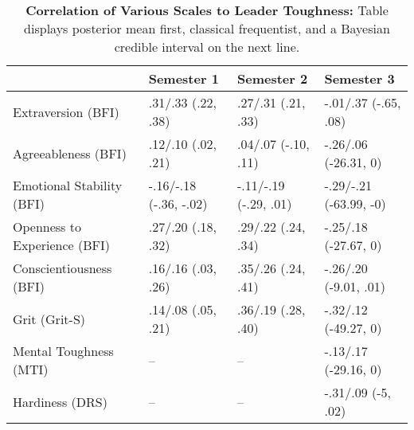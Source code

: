 \begin{table}[ht]
\centering
\begin{tabular}{llll}
  \hline
 & Semester 1 & Semester 2 & Semester 3 \\ 
  \hline
Extraversion (BFI) & .31/.33 (.22, .38) & .27/.31 (.21, .33) & -.01/.37 (-.65, .08) \\ 
  Agreeableness (BFI) & .12/.10 (.02, .21) & .04/.07 (-.10, .11) & -.26/.06 (-26.31, 0) \\ 
  Emotional Stability (BFI) & -.16/-.18 (-.36, -.02) & -.11/-.19 (-.29, .01) & -.29/-.21 (-63.99, -0) \\ 
  Openness to Experience (BFI) & .27/.20 (.18, .32) & .29/.22 (.24, .34) & -.25/.18 (-27.67, 0) \\ 
  Conscientiousness (BFI) & .16/.16 (.03, .26) & .35/.26 (.24, .41) & -.26/.20 (-9.01, .01) \\ 
  Grit (Grit-S) & .14/.08 (.05, .21) & .36/.19 (.28, .40) & -.32/.12 (-49.27, 0) \\ 
  Mental Toughness (MTI) & -- & -- & -.13/.17 (-29.16, 0) \\ 
  Hardiness (DRS) & -- & -- & -.31/.09 (-5, .02) \\ 
   \hline
\end{tabular}
\caption{\textbf{Correlation of Various Scales to Leader Toughness:} Table displays posterior mean first, classical frequentist, and a Bayesian credible interval on the next line.} 
\label{tab:pers_corr}
\end{table}
